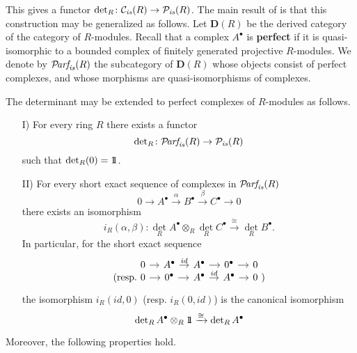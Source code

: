 \documentclass{article}
\numberwithin{equation}{section}
\begin{document}
\begin{appendices}
This gives a functor $\operatorname{det}_R\colon \mathcal{C}_{\text{\it is}} (R) \to \mathcal{P}_{\text{\it is}} (R)$.
The main result of \cite[Chapter~I]{Knudsen-Mumford-1976} is that this
construction may be generalized as follows. Let $\mathbf{D} (R)$ be the derived
category of the category of $R$-modules. Recall that a complex $A^\bullet$ is
\textbf{perfect} if it is quasi-isomorphic to a bounded complex of finitely
generated projective $R$-modules. We denote by $\mathcal{P}\!\text{\it arf}_{\text{\it is}} (R)$ the subcategory
of $\mathbf{D} (R)$ whose objects consist of perfect complexes, and whose
morphisms are quasi-isomorphisms of complexes.

\begin{theorem}
  The determinant may be extended to perfect complexes of $R$-modules as
  follows.

  \begin{enumerate}
  \item[I)] For every ring $R$ there exists a functor
    $$\operatorname{det}_R\colon \mathcal{P}\!\text{\it arf}_{\text{\it is}} (R) \to \mathcal{P}_{\text{\it is}} (R)$$
    such that $\operatorname{det}_R (0) = 1\!\!1$.

  \item[II)] For every short exact sequence of complexes in $\mathcal{P}\!\text{\it arf}_{\text{\it is}} (R)$
    \[ 0 \to A^\bullet \xrightarrow{\alpha} B^\bullet
      \xrightarrow{\beta} C^\bullet \to 0 \]
    there exists an isomorphism
    \[ i_R (\alpha,\beta)\colon
      \det_R A^\bullet \otimes_R \det_R C^\bullet
      \xrightarrow{\cong} \det_R B^\bullet. \]
    In particular, for the short exact sequence
    \[ \begin{tikzcd}[column sep=1em]
        &[-1.5em] 0 \ar{r} & A^\bullet \ar{r}{id} & A^\bullet \ar{r} & 0^\bullet \ar{r} & 0 &[-1.5em] \\[-2em]
        \text{(resp.} & 0 \ar{r} & 0^\bullet \ar{r} & A^\bullet \ar{r}{id} & A^\bullet \ar{r} & 0 & \text{)}
      \end{tikzcd} \]
    the isomorphism $i_R (id,0)$ (resp. $i_R (0,id)$) is the canonical isomorphism
    $$\operatorname{det}_R A^\bullet \otimes_R 1\!\!1 \xrightarrow{\cong} \operatorname{det}_R A^\bullet$$
  \end{enumerate}

  Moreover, the following properties hold.


\end{theorem}
\end{appendices}
\end{document}
